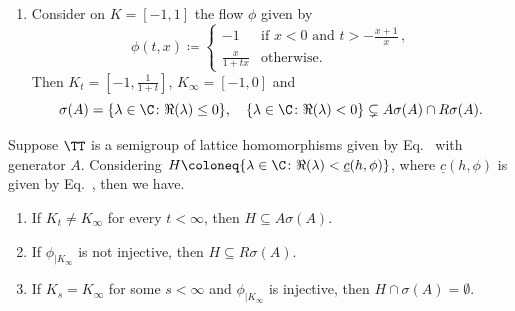 \begin{examples}
\begin{enumerate}[\upshape (i), wide, labelindent=.25em]
	\item 
	Consider on $K = [-1,1]$ the flow $\phi$ given by
	\[
	\phi(t,x)\coloneq \begin{cases}
		-1 & \text{if } x < 0 \text{ and } t > -\frac{x+1}{x} \,, \\
		\frac{x}{1+tx} & \text{otherwise.}
	\end{cases}
	\]
	Then $K_{t} = [-1,\frac{1}{1+t}]$, $K_{\infty} = [-1,0]$ and
	\[
	\sigma(A) = \{\lambda \in \C \colon \Re(\lambda) \leq 0\},\quad 
	\{\lambda \in \C \colon \Re(\lambda) < 0\} \subsetneq A\sigma(A)\cap R\sigma(A).
	\]
	\end{enumerate}
\end{examples}
\begin{theorem}\label{thm:b3-4.4}
	Suppose $\TT$ is a semigroup of lattice homomorphisms given by Eq.~ with generator $A$.
	Considering $H \coloneq \{\lambda \in \C \colon \Re(\lambda) < \underline{c}(h,\phi)\}$, where $\underline{c}(h,\phi)$ is given by Eq.~, then we have.
	\begin{enumerate}[\upshape (i)]
		\item 
		If\/ $K_{t} \neq K_{\infty}$ for every $t < \infty$, then $H \subseteq A\sigma(A)$.
	
		\item 
		If\/ $\phi_{|K_{\infty}}$ is not injective, then $H \subseteq R\sigma(A)$.
	
		\item 
		If\/ $K_{s} = K_{\infty}$ for some $s < \infty$ and $\phi_{|K_{\infty}}$ is injective, then $H\cap\sigma(A) = \emptyset$.
	\end{enumerate} 
\end{theorem}
